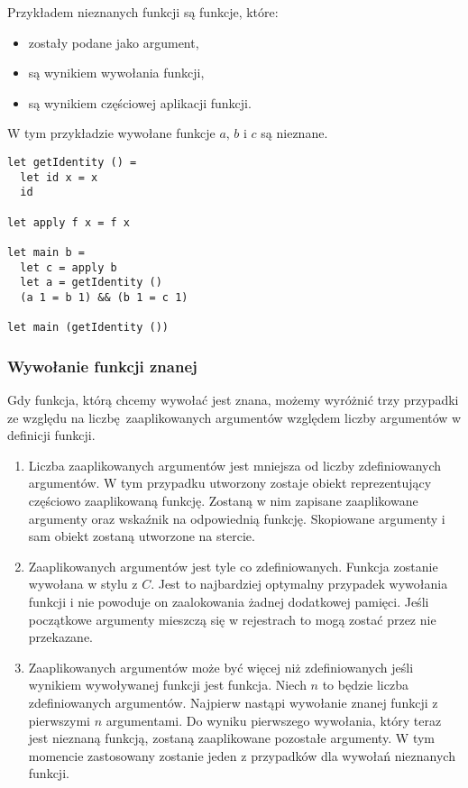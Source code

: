 \documentclass[declaration,shortabstract]{iithesis}
\begin{document}
Przykładem nieznanych funkcji są funkcje, które: 
\begin{itemize}
  \item zostały podane jako argument,
  \item są wynikiem wywołania funkcji,
  \item są wynikiem częściowej aplikacji funkcji.
\end{itemize}

W tym przykładzie wywołane funkcje $a$, $b$ i $c$ są nieznane.

\begin{lstlisting}[frame=single, caption=Przykłady statycznie 
nieznanej funkcji.]
let getIdentity () = 
  let id x = x 
  id

let apply f x = f x

let main b = 
  let c = apply b 
  let a = getIdentity ()
  (a 1 = b 1) && (b 1 = c 1)

let main (getIdentity ())
\end{lstlisting}

\subsubsection{Wywołanie funkcji znanej}

Gdy funkcja, którą chcemy wywołać jest znana, możemy wyróżnić trzy przypadki 
ze względu na liczbę zaaplikowanych argumentów względem liczby argumentów
w definicji funkcji.

\begin{enumerate}
  \item Liczba zaaplikowanych argumentów jest mniejsza od liczby zdefiniowanych 
  argumentów. W tym przypadku utworzony zostaje obiekt reprezentujący częściowo
  zaaplikowaną funkcję. Zostaną w nim zapisane zaaplikowane argumenty oraz 
  wskaźnik na odpowiednią funkcję. Skopiowane argumenty i sam obiekt zostaną 
  utworzone na stercie.
  \item Zaaplikowanych argumentów jest tyle co zdefiniowanych. Funkcja zostanie
  wywołana w stylu z $C$. Jest to najbardziej optymalny przypadek wywołania 
  funkcji i nie powoduje on zaalokowania żadnej dodatkowej pamięci. Jeśli 
  początkowe argumenty mieszczą się w rejestrach to mogą zostać przez nie 
  przekazane.
  \item Zaaplikowanych argumentów może być więcej niż zdefiniowanych jeśli wynikiem wywoływanej funkcji jest funkcja. Niech $n$ to będzie liczba 
  zdefiniowanych argumentów. Najpierw nastąpi wywołanie znanej funkcji z 
  pierwszymi $n$ argumentami. Do wyniku pierwszego wywołania, który teraz jest
  nieznaną funkcją, zostaną zaaplikowane pozostałe argumenty. W tym momencie 
  zastosowany zostanie jeden z przypadków dla wywołań nieznanych funkcji.

\end{enumerate}
\end{document}
